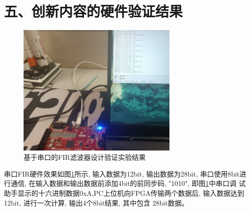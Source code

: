 \documentclass{article}
\newcommand{\fourhao}{\fontsize{14pt}{\baselineskip}\selectfont} %
\newcommand{\xiaosihao}{\fontsize{12pt}{\baselineskip}\selectfont} %
\begin{document}
\section*{\fourhao 五、创新内容的硬件验证结果}
\xiaosihao
{}
\begin{figure}[H]
    \centering
    \includegraphics[width=0.7\textwidth]{image/2024-06-27-21-22-24.png}
    \caption{基于串口的FIR滤波器设计验证实验结果}
    \label{image_verify_hardware_1}
\end{figure}
串口FIR硬件效果如图\ref{image_verify_hardware_1}所示, 输入数据为12bit, 输出数据为28bit, 
串口使用8bit进行通信, 在输入数据和输出数据前添加4bit的前同步码, "1010", 即图\ref{image_verify_hardware_1}中串口调
试助手显示的十六进制数据0xA,PC上位机向FPGA传输两个数据后, 输入数据达到12bit, 进行一次计算, 输出4个8bit结果, 其中包含
28bit数据。\\
\end{document}
